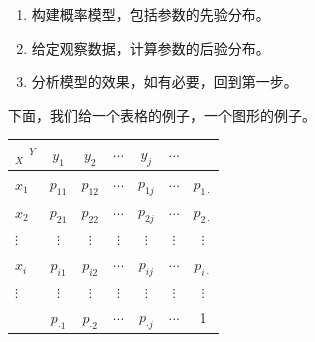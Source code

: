\begin{enumerate}
 \item 构建概率模型，包括参数的先验分布。
 \item 给定观察数据，计算参数的后验分布。
 \item 分析模型的效果，如有必要，回到第一步。
\end{enumerate}

\begin{example}
下面，我们给一个表格的例子，一个图形的例子。

\begin{center}
\begin{table}[!ht]     %
\centering

\begin{tabular}{l|ccccc|c}
  $_X$\hspace{3mm} $^Y$&$y_1$&$y_2$&$\cdots$&$y_j$&$\cdots$\\
\hline
$x_1$   &$p_{11}$&$p_{12}$&$\cdots$&$p_{1j}$&$\cdots$&$p_{1\cdot}$\\
$x_2$   &$p_{21}$&$p_{22}$&$\cdots$&$p_{2j}$&$\cdots$&$p_{2\cdot}$\\
$\vdots$&$\vdots$&$\vdots$&$\vdots$&$\vdots$&$\vdots$&$\vdots$\\
$x_i$   &$p_{i1}$&$p_{i2}$&$\cdots$&$p_{ij}$&$\cdots$&$p_{i\cdot}$\\
$\vdots$&$\vdots$&$\vdots$&$\vdots$&$\vdots$&$\vdots$&$\vdots$\\
\hline
   &$p_{\cdot 1}$&$p_{\cdot 2}$&$\cdots$&$p_{\cdot j}$&$\cdots$&1

\end{tabular}
\end{table}
\end{center}

\end{example}
